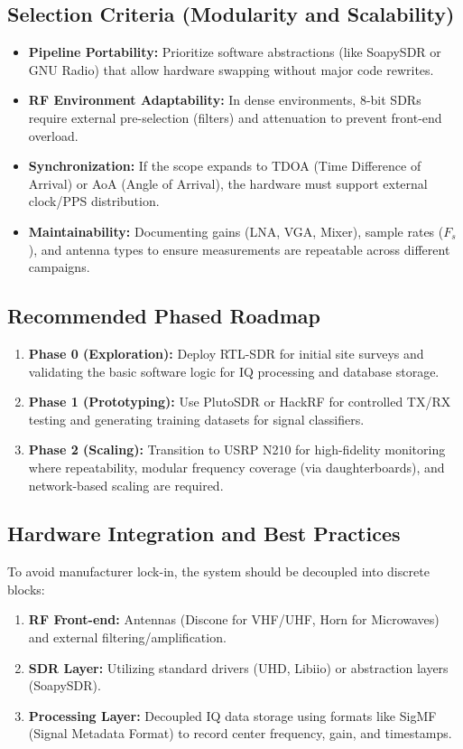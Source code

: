 \documentclass[11pt]{report}
\begin{document}
\subsection*{Selection Criteria (Modularity and Scalability)}
\begin{itemize}[leftmargin=*]
\item \textbf{Pipeline Portability:} Prioritize software abstractions (like SoapySDR or GNU Radio) that allow hardware swapping without major code rewrites.
\item \textbf{RF Environment Adaptability:} In dense environments, 8-bit SDRs require external pre-selection (filters) and attenuation to prevent front-end overload.
\item \textbf{Synchronization:} If the scope expands to TDOA (Time Difference of Arrival) or AoA (Angle of Arrival), the hardware must support external clock/PPS distribution.
\item \textbf{Maintainability:} Documenting gains (LNA, VGA, Mixer), sample rates ($F_s$), and antenna types to ensure measurements are repeatable across different campaigns.
\end{itemize}

\subsection*{Recommended Phased Roadmap}
\begin{enumerate}[leftmargin=*,label=\arabic*)]
\item \textbf{Phase 0 (Exploration):} Deploy RTL-SDR for initial site surveys and validating the basic software logic for IQ processing and database storage.
\item \textbf{Phase 1 (Prototyping):} Use PlutoSDR or HackRF for controlled TX/RX testing and generating training datasets for signal classifiers.
\item \textbf{Phase 2 (Scaling):} Transition to USRP N210 for high-fidelity monitoring where repeatability, modular frequency coverage (via daughterboards), and network-based scaling are required.
\end{enumerate}

\subsection*{Hardware Integration and Best Practices}
To avoid manufacturer lock-in, the system should be decoupled into discrete blocks:
\begin{enumerate}[leftmargin=*]
    \item \textbf{RF Front-end:} Antennas (Discone for VHF/UHF, Horn for Microwaves) and external filtering/amplification.
    \item \textbf{SDR Layer:} Utilizing standard drivers (UHD, Libiio) or abstraction layers (SoapySDR).
    \item \textbf{Processing Layer:} Decoupled IQ data storage using formats like SigMF (Signal Metadata Format) to record center frequency, gain, and timestamps.
\end{enumerate}
\end{document}

